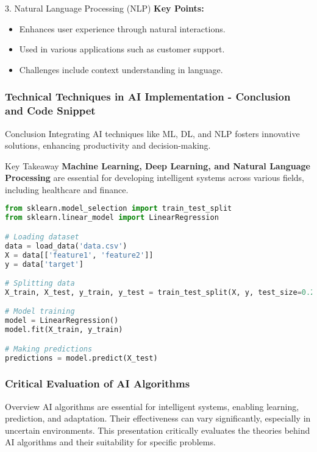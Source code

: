 \documentclass[aspectratio=169]{beamer}
\begin{document}
\begin{frame}[fragile]
\begin{block}{3. Natural Language Processing (NLP)}
        \textbf{Key Points:}
        \begin{itemize}
            \item Enhances user experience through natural interactions.
            \item Used in various applications such as customer support.
            \item Challenges include context understanding in language.
        \end{itemize}
    \end{block}
\end{frame}

\begin{frame}[fragile]
    \frametitle{Technical Techniques in AI Implementation - Conclusion and Code Snippet}
    \begin{block}{Conclusion}
        Integrating AI techniques like ML, DL, and NLP fosters innovative solutions, enhancing productivity and decision-making.
    \end{block}

    \begin{block}{Key Takeaway}
        \textbf{Machine Learning, Deep Learning, and Natural Language Processing} are essential for developing intelligent systems across various fields, including healthcare and finance.
    \end{block}
    
    \begin{lstlisting}[language=Python, frame=single]
from sklearn.model_selection import train_test_split
from sklearn.linear_model import LinearRegression

# Loading dataset
data = load_data('data.csv')
X = data[['feature1', 'feature2']]
y = data['target']

# Splitting data
X_train, X_test, y_train, y_test = train_test_split(X, y, test_size=0.2)

# Model training
model = LinearRegression()
model.fit(X_train, y_train)

# Making predictions
predictions = model.predict(X_test)
    \end{lstlisting}
\end{frame}

\begin{frame}
    \frametitle{Critical Evaluation of AI Algorithms}
    \begin{block}{Overview}
        AI algorithms are essential for intelligent systems, enabling learning, prediction, and adaptation. Their effectiveness can vary significantly, especially in uncertain environments. This presentation critically evaluates the theories behind AI algorithms and their suitability for specific problems.
    \end{block}
\end{frame}
\end{document}
